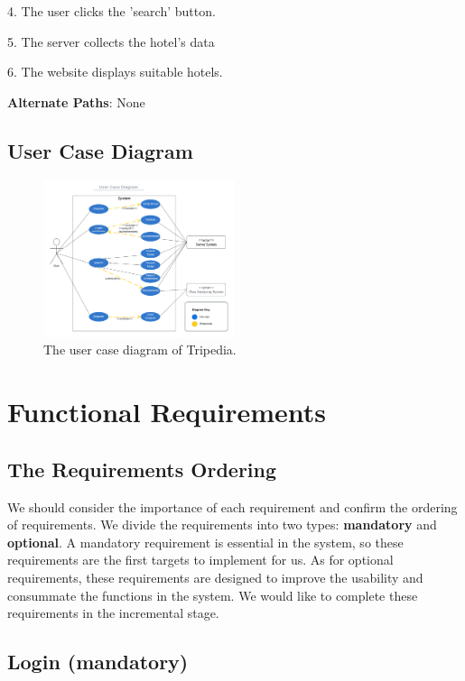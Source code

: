 \documentclass[conference]{IEEEtran}
\begin{document}
4. The user clicks the 'search' button.

5. The server collects the hotel's data

6. The website displays suitable hotels.

\textbf{Alternate Paths}: None



\subsection{User Case Diagram}


\begin{figure}[htbp]
\centerline{\includegraphics[width=0.5\textwidth]{UserCaseDiagram.pdf}}
\caption{The user case diagram of Tripedia.}
\label{fig2}
\end{figure}



\section{Functional Requirements}

\subsection{ The Requirements Ordering }

We should consider the importance of each requirement and confirm the ordering of requirements.
We divide the requirements into two types: \textbf{mandatory} and \textbf{optional}. A mandatory requirement 
is essential in the system, so these requirements are the first targets to implement for us.
As for optional requirements, these requirements are designed to improve the usability and consummate
the functions in the system. We would like to complete these requirements in the incremental stage.


\subsection{ Login (mandatory)}
\end{document}
